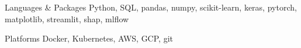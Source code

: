 
\begin{cvskills}

  \cvskill
    {Languages \& Packages} %
    {Python, SQL, pandas, numpy, scikit-learn, keras, pytorch, matplotlib, streamlit, shap, mlflow} %

  \cvskill
    {Platforms} %
    {Docker, Kubernetes, AWS, GCP, git} %

\end{cvskills}